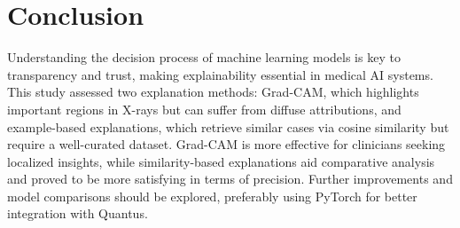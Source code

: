 \documentclass[9pt]{midl} %
\begin{document}
\vspace{-1cm}

\section{Conclusion}\label{sec:conclusion}
Understanding the decision process of machine learning models is key to transparency and trust, making explainability essential in medical AI systems. This study assessed two explanation methods: Grad-CAM, which highlights important regions in X-rays but can suffer from diffuse attributions, and example-based explanations, which retrieve similar cases via cosine similarity but require a well-curated dataset. Grad-CAM is more effective for clinicians seeking localized insights, while similarity-based explanations aid comparative analysis and proved to be more satisfying in terms of precision. Further improvements and model comparisons should be explored, preferably using PyTorch for better integration with Quantus.






\end{document}
